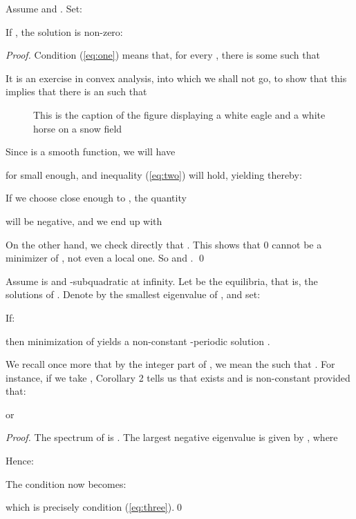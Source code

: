 \documentclass{llncs}
\begin{document}
\begin{proposition}
Assume  and . Set:


If ,
the solution  is non-zero:

\end{proposition}
\begin{proof}
Condition (\ref{eq:one}) means that, for every
, there is some  such that


It is an exercise in convex analysis, into which we shall not go, to
show that this implies that there is an  such that


\begin{figure}
\vspace{2.5cm}
\caption{This is the caption of the figure displaying a white eagle and
a white horse on a snow field}
\end{figure}

Since  is a smooth function, we will have

for  small enough, and inequality (\ref{eq:two}) will hold,
yielding thereby:


If we choose  close enough to , the quantity

will be negative, and we end up with


On the other hand, we check directly that . This shows
that 0 cannot be a minimizer of , not even a local one.
So  and
. \qed
\end{proof}
\begin{corollary}
Assume  is  and
-subquadratic at infinity. Let
  be the
equilibria, that is, the solutions of .
Denote by 
the smallest eigenvalue of , and set:

If:

then minimization of  yields a non-constant -periodic solution
.
\end{corollary}

We recall once more that by the integer part  of
, we mean the 
such that . For instance,
if we take , Corollary 2 tells
us that  exists and is
non-constant provided that:


or


\begin{proof}
The spectrum of  is . The
largest negative eigenvalue  is given by
,
where

Hence:


The condition  now becomes:

which is precisely condition (\ref{eq:three}).\qed
\end{proof}
\end{document}
